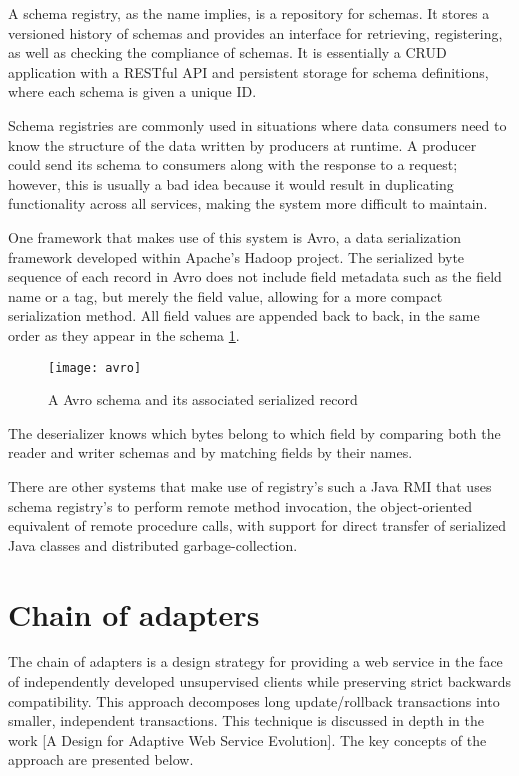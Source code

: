 A schema registry, as the name implies, is a repository for schemas.
It stores a versioned history of schemas and provides an interface for retrieving, registering, as well as checking the compliance of schemas.
It is essentially a CRUD application with a RESTful API and persistent storage for schema definitions, where each schema is given a unique ID.

Schema registries are commonly used in situations where data consumers need to know the structure of the data written by producers at runtime.
A producer could send its schema to consumers along with the response to a request;
however, this is usually a bad idea because it would result in duplicating functionality across all services, making the system more difficult to maintain.

One framework that makes use of this system is Avro, a data serialization framework developed within Apache's Hadoop project.
The serialized byte sequence of each record in Avro does not include field metadata such as the field name or a tag, but merely the field value, allowing for a more compact serialization method.
All field values are appended back to back, in the same order as they appear in the schema \ref{fig:avro}.

\begin{figure}[htbp]
    \centering
    \texttt{[image: avro]}
    \caption{A Avro schema and its associated serialized record }
    \label{fig:avro}
\end{figure}

The deserializer knows which bytes belong to which field by comparing both the reader and writer schemas and by matching fields by their names.

There are other systems that make use of registry's such a Java RMI that uses schema registry's
to perform remote method invocation, the object-oriented equivalent of remote procedure calls, with support for direct
transfer of serialized Java classes and distributed garbage-collection.

\section{Chain of adapters} %
\label{sec:chain_of_adapters}

The chain of adapters is a design strategy for providing a web service in the face of independently developed unsupervised clients while preserving strict backwards compatibility.
This approach decomposes long update/rollback transactions into smaller, independent transactions.
This technique is discussed in depth in the work [A Design for Adaptive Web Service Evolution]. The key concepts of the approach are presented below.

